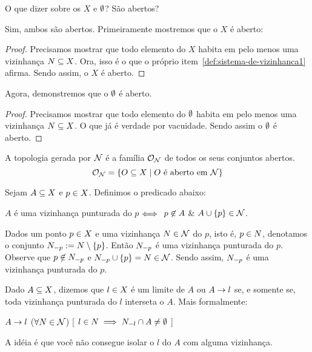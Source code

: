 \begin{question}
	\label{universo-aberto}
	\label{vazio-aberto}
	O que dizer sobre os $X$ e $\emptyset$? São abertos?
\end{question}

\begin{answer}
	Sim, ambos são abertos. Primeiramente mostremos que o $X$ é aberto:
	\begin{proof}
		Precisamos mostrar que todo elemento do $X$ habita em pelo menos uma vizinhança $N \subseteq X$. Ora, isso é o que o próprio item~\ref{def:sistema-de-vizinhanca1} afirma. Sendo assim, o $X$ é aberto.
	\end{proof}
	Agora, demonstremos que o $\emptyset$ é aberto.
	\begin{proof}
		Precisamos mostrar que todo elemento do $\emptyset$ habita em pelo menos uma vizinhança $N \subseteq X$. O que já é verdade por vacuidade. Sendo assim o $\emptyset$ é aberto.
	\end{proof}
\end{answer}

\begin{definition}[Topologia]
	\label{def:topologia}
	A topologia gerada por $\mathcal{N}$ é a família $\mathcal{O}_{\mathcal{N}}$ de todos os seus conjuntos abertos.
	\[
		\mathcal{O}_{\mathcal{N}} = \left\{ O \subseteq X \mid \text{$O$ é aberto em \ensuremath{\mathcal{N}}}\right\}
	\]
\end{definition}

\begin{definition}
	\label{def:vizinhanca-punturada}
	Sejam $A \subseteq X$ e $p \in X$. Definimos o predicado abaixo:
	\begin{center}
		$A$ é uma vizinhança punturada do $p$ $\Longleftrightarrow\;$ $p \not\in A$ \& $A \cup \left\{p\right\} \in \mathcal{N}$.
	\end{center}
	\begin{example}
		Dados um ponto $p \in X$ e uma vizinhança $N \in \mathcal{N}$ do $p$, isto é, $p \in N$, denotamos o conjunto $N_{-p} := N \setminus \left\{p\right\}$. Então $N_{-p}$ é uma vizinhança punturada do $p$. Observe que $p \not\in N_{-p}$ e $N_{-p} \cup \left\{p\right\} = N \in \mathcal{N}$.
		Sendo assim, $N_{-p}$ é uma vizinhança punturada do $p$.
	\end{example}
\end{definition}

\begin{definition}[Limite]
	\label{def:limit-point}
	Dado $A \subseteq X$, dizemos que $l \in X$ é um limite de $A$ ou $A \rightarrow l$ se, e somente se, toda vizinhança punturada do $l$ interseta o $A$. Mais formalmente:
	\begin{center}
		$A \rightarrow l$ \sse
			($\forall N \in \mathcal{N}$)%
			[ $l \in N \implies N_{-l} \cap A \neq \emptyset$ ]
	\end{center}
	A idéia é que você não consegue isolar o $l$ do $A$ com alguma vizinhança.
\end{definition}

